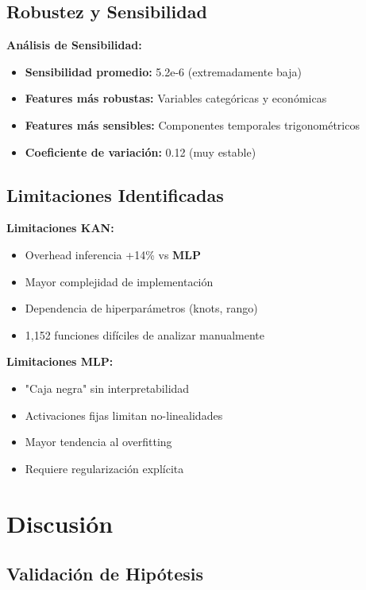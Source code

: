 \documentclass[10pt,twocolumn]{article}
\newcommand{\kan}{\textbf{KAN}}
\newcommand{\mlp}{\textbf{MLP}}
\begin{document}
\subsection{Robustez y Sensibilidad}

\textbf{Análisis de Sensibilidad:}
\begin{itemize}
    \item \textbf{Sensibilidad promedio:} 5.2e-6 (extremadamente baja)
    \item \textbf{Features más robustas:} Variables categóricas y económicas
    \item \textbf{Features más sensibles:} Componentes temporales trigonométricos
    \item \textbf{Coeficiente de variación:} 0.12 (muy estable)
\end{itemize}

\subsection{Limitaciones Identificadas}

\textbf{Limitaciones \kan:}
\begin{itemize}
    \item Overhead inferencia +14\% vs \mlp
    \item Mayor complejidad de implementación
    \item Dependencia de hiperparámetros (knots, rango)
    \item 1,152 funciones difíciles de analizar manualmente
\end{itemize}

\textbf{Limitaciones \mlp:}
\begin{itemize}
    \item "Caja negra" sin interpretabilidad
    \item Activaciones fijas limitan no-linealidades
    \item Mayor tendencia al overfitting
    \item Requiere regularización explícita
\end{itemize}

\section{Discusión}

\subsection{Validación de Hipótesis}
\end{document}
